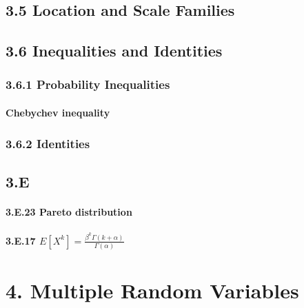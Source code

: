 \documentclass[6pt,twocolumn,Portrait]{article}
\let\oldparagraph\paragraph
\renewcommand{\paragraph}[1]{\oldparagraph{#1}\mbox{}}
\begin{document}
\hypertarget{location-and-scale-families}{%
\subsection{3.5 Location and Scale
Families}\label{location-and-scale-families}}

\hypertarget{inequalities-and-identities}{%
\subsection{3.6 Inequalities and
Identities}\label{inequalities-and-identities}}

\hypertarget{probability-inequalities}{%
\subsubsection{3.6.1 Probability
Inequalities}\label{probability-inequalities}}

\hypertarget{Cheb}{%
\paragraph{Chebychev inequality}\label{Cheb}}

\hypertarget{identities}{%
\subsubsection{3.6.2 Identities}\label{identities}}

\hypertarget{e}{%
\subsection{3.E}\label{e}}

\hypertarget{Pareto}{%
\paragraph{3.E.23 Pareto distribution}\label{Pareto}}

\hypertarget{GammaE}{%
\paragraph{\texorpdfstring{3.E.17
\(E[X^k]=\frac{\beta^k\Gamma(k+\alpha)}{\Gamma(\alpha)}\)}{3.E.17 E{[}X\^{}k{]}=\textbackslash{}frac\{\textbackslash{}beta\^{}k\textbackslash{}Gamma(k+\textbackslash{}alpha)\}\{\textbackslash{}Gamma(\textbackslash{}alpha)\}}}\label{GammaE}}

\hypertarget{multiple-random-variables}{%
\section{4. Multiple Random Variables}\label{multiple-random-variables}}
\end{document}

